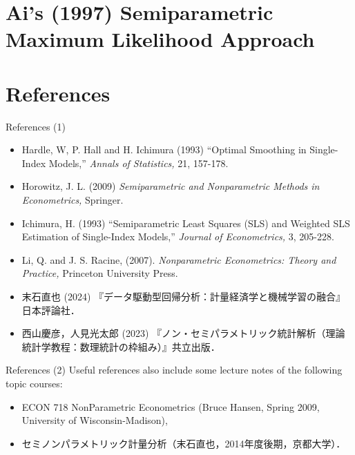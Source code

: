 \documentclass[xcolor=svgnames,dvipdfmx,cjk]{beamer}
\theoremstyle{example}
\begin{document}
  
  
  
  
  
  
  
  
  \section{Ai's (1997) Semiparametric Maximum Likelihood Approach}
  
  
  
  
  
  
  
  
  
  
  \section{References}
  
  
  \begin{frame}{References (1)}
    \begin{itemize}
      \item Hardle, W, P. Hall and H. Ichimura (1993)
            ``Optimal Smoothing in Single-Index Models,'' \textit{Annals of Statistics,} 21, 157-178.
      \item Horowitz, J. L. (2009)
            \textit{Semiparametric and Nonparametric Methods in Econometrics,}
            Springer.
      \item Ichimura, H. (1993) 
            ``Semiparametric Least Squares (SLS) and Weighted SLS Estimation of Single-Index Models,''
            \textit{Journal of Econometrics,} 3, 205-228. 
      \item Li, Q. and J. S. Racine, (2007). 
            \textit{Nonparametric Econometrics: Theory and Practice,} 
            Princeton University Press.
      \item 末石直也 (2024) 『データ駆動型回帰分析：計量経済学と機械学習の融合』日本評論社．
      \item 西山慶彦，人見光太郎 (2023) 『ノン・セミパラメトリック統計解析（理論統計学教程：数理統計の枠組み）』共立出版．
    \end{itemize}
  \end{frame}


\begin{frame}{References (2)}
\quad 
Useful references also include some lecture notes of the following topic courses:
  \begin{itemize}
    \item ECON 718 NonParametric Econometrics (Bruce Hansen, Spring 2009, University of Wisconsin-Madison),
    \item セミノンパラメトリック計量分析（末石直也，2014年度後期，京都大学）．
  \end{itemize}
\end{frame}
\end{document}
